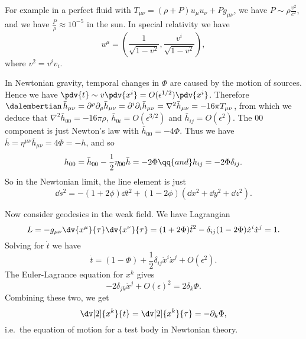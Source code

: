 \documentclass{jknotes}
\begin{document}
For example in a perfect fluid with \(T_{\mu\nu} = (\rho+P)u_\mu u_\nu + P g_{\mu\nu}\), we have \(P\sim \rho \frac{v^2}{c^2}\), and we have \(\frac{P}{\rho}\approx 10^{-5}\) in the sun. In special relativity we have
\begin{equation}
    u^\mu = \left( \frac1{\sqrt{1-v^2}},\frac{v^i}{\sqrt{1-v^2}}\right),
\end{equation}
where \(v^2 = v^iv_i\).

In Newtonian gravity, temporal changes in \(\Phi\) are caused by the motion of sources. Hence we have \(\pdv{t}\sim v\pdv{x^i} = O(\epsilon^{1/2}) \pdv{x^i}\). Therefore \(\dalembertian\,\bar{h}_{\mu\nu} = \partial^\rho\partial_\rho \bar{h}_{\mu\nu} = \partial^i\partial_i\bar{h}_{\mu\nu} = \nabla^2\bar{h}_{\mu\nu} = -16\pi T_{\mu\nu}\), from which we deduce that \(\nabla^2\bar{h}_{00} = -16\pi\rho\), \(\bar{h}_{0i} = O(\epsilon^{3/2})\) and \(\bar{h}_{ij} = O(\epsilon^2)\). The \(00\) component is just Newton's law with \(\bar{h}_{00} = -4\Phi\). Thus we have \(\bar{h} = \eta^{\mu\nu}\bar{h}_{\mu\nu} = 4\Phi = -h\), and so 
\begin{equation}
    h_{00} = \bar{h}_{00} - \frac12\eta_{00}\bar{h} = -2\Phi \qq{and} h_{ij} = -2\Phi\delta_{ij}.
\end{equation}
So in the Newtonian limit, the line element is just
\begin{equation}
    \dd{s}^2 = -(1+2\phi)\dd{t}^2 + (1-2\phi)(\dd{x}^2+\dd{y}^2+\dd{z}^2).
\end{equation}

Now consider geodesics in the weak field. We have Lagrangian
\begin{equation}
    L = -g_{\mu\nu} \dv{x^\mu}{\tau} \dv{x^\nu}{\tau} = (1+2\Phi) \dot{t}^2 - \delta_{ij}(1-2\Phi)\dot{x}^i\dot{x}^j = 1.
\end{equation}
Solving for \(\dot{t}\) we have
\begin{equation}
    \dot{t} = (1-\Phi) + \frac12\delta_{ij}\dot{x}^i\dot{x}^j + O(\epsilon^2).
\end{equation}
The Euler-Lagrance equation for \(x^k\) gives
\begin{equation}
    -2\delta_{jk}\ddot{x}^j + O(\epsilon)^2 = 2\delta_k\Phi.
\end{equation}
Combining these two, we get
\begin{equation}
    \dv[2]{x^k}{t} = \dv[2]{x^k}{\tau} = -\partial_k\Phi,
\end{equation}
i.e.\ the equation of motion for a test body in Newtonian theory.
\end{document}
